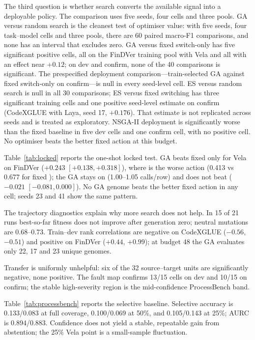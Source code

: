 The third question is whether search converts the available signal into a
deployable policy. The comparison uses five seeds, four cells and three pools.
GA versus
random search is the cleanest test of optimiser value: with five seeds, four
task--model cells and three pools, there are 60 paired macro-F1 comparisons, and
none has an interval that excludes zero. GA versus fixed switch-only has five
significant positive cells, all on the FinDVer training pool with Vela and all with
an effect near $+0.12$; on dev and confirm, none of the 40 comparisons is
significant. The prespecified deployment comparison---train-selected GA
against fixed switch-only on confirm---is null in every seed-level cell. ES
versus random search is null in all 30 comparisons; ES versus fixed switching
has three significant training cells and one positive seed-level estimate on
confirm (CodeXGLUE with Laya, seed 17, $+0.176$). That estimate is not replicated
across seeds and is treated as exploratory. NSGA-II deployment is significantly
worse than the fixed baseline in five dev cells and one confirm cell, with no
positive cell. No optimiser beats the better fixed action at this budget.

Table~\ref{tab:locked} reports the one-shot locked test. GA beats fixed
\choice{} only for Vela on FinDVer ($+0.243$ $[+0.138,+0.318]$), where \choice{} is
the worse action (0.413 vs 0.677 for fixed \noul{}); the GA stays on \noul{}
(1.00--1.05 calls/row) and does not beat \noul{} ($-0.021$ $[-0.081,0.000]$).
No GA genome beats the better fixed action in any cell; seeds 23 and 41 show
the same pattern.



The trajectory diagnostics explain why more search does not help. In 15 of 21
runs best-so-far fitness does not improve after generation zero; neutral
mutations are 0.68--0.73. Train--dev rank correlations are negative on
CodeXGLUE ($-0.56$, $-0.51$) and positive on FinDVer ($+0.44$, $+0.99$); at
budget 48 the GA evaluates only 22, 17 and 23 unique genomes.

Transfer is uniformly unhelpful: six of the 32 source--target units are
significantly negative, none positive. The fault map confirms 13/15 cells on
dev and 10/15 on confirm; the stable high-severity region is the mid-confidence
ProcessBench band.

Table~\ref{tab:processbench} reports the selective baseline. Selective accuracy
is 0.133/0.083 at full coverage, 0.100/0.069 at 50\%, and 0.105/0.143 at 25\%;
AURC is 0.894/0.883. Confidence does not yield a stable, repeatable gain from
abstention; the 25\% Vela point is a small-sample fluctuation.




